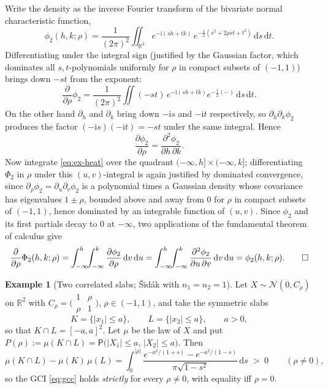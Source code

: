 \documentclass[12pt,a4paper]{article}
\makeatletter
\theoremstyle{definition}
\newtheorem{example}[theorem]{Example}
\renewenvironment{proof}[1][\proofname]{\par
  \pushQED{\qed}%
  \normalfont \topsep6\p@\@plus6\p@\relax
  \trivlist
  \item[\hskip\labelsep\bfseries #1\@addpunct{.}]\ignorespaces
}{%
  \popQED\endtrivlist\@endpefalse
}
\newcommand{\R}{\mathbb{R}}
\newcommand{\PP}{\mathsf{P}}
\newcommand{\dd}{\mathrm{d}}
\newcommand{\caln}{\mathcal{N}}
\makeatother
\begin{document}
\begin{proof}
  Write the density as the inverse Fourier transform of the bivariate
  normal characteristic function,
  \[
    \phi_2(h,k;\rho)
    =\frac{1}{(2\pi)^2}\iint_{\R^2}
      e^{-\mathrm i(sh+tk)}\,
      e^{-\frac12(s^2+2\rho st+t^2)}\,\dd s\,\dd t .
  \]
  Differentiating under the integral sign (justified by the Gaussian
  factor, which dominates all $s,t$-polynomials uniformly for $\rho$ in
  compact subsets of $(-1,1)$) brings down $-st$ from the exponent:
  \[
    \frac{\partial}{\partial\rho}\phi_2
    =\frac{1}{(2\pi)^2}\iint(-st)\,
      e^{-\mathrm i(sh+tk)}e^{-\frac12(\cdots)}\,\dd s\,\dd t .
  \]
  On the other hand $\partial_h$ and $\partial_k$ bring down $-\mathrm i s$
  and $-\mathrm i t$ respectively, so
  $\partial_h\partial_k\phi_2$ produces the factor
  $(-\mathrm i s)(-\mathrm i t)=-st$ under the same integral.  Hence
  \begin{equation}\label{eq:ex-heat}
    \frac{\partial\phi_2}{\partial\rho}
    =\frac{\partial^2\phi_2}{\partial h\,\partial k}.
  \end{equation}
  Now integrate \eqref{eq:ex-heat} over the quadrant
  $(-\infty,h]\times(-\infty,k]$; differentiating $\Phi_2$ in $\rho$
  under this $(u,v)$-integral is again justified by dominated
  convergence, since $\partial_\rho\phi_2=\partial_u\partial_v\phi_2$ is a
  polynomial times a Gaussian density whose covariance has eigenvalues
  $1\pm\rho$, bounded above and away from $0$ for $\rho$ in compact
  subsets of $(-1,1)$, hence dominated by an integrable function of
  $(u,v)$.  Since $\phi_2$ and its first partials
  decay to $0$ at $-\infty$, two applications of the fundamental theorem
  of calculus give
  \[
    \frac{\partial}{\partial\rho}\Phi_2(h,k;\rho)
    =\int_{-\infty}^{h}\!\!\int_{-\infty}^{k}
      \frac{\partial\phi_2}{\partial\rho}\,\dd v\,\dd u
    =\int_{-\infty}^{h}\!\!\int_{-\infty}^{k}
      \frac{\partial^2\phi_2}{\partial u\,\partial v}\,\dd v\,\dd u
    =\phi_2(h,k;\rho).\qedhere
  \]
\end{proof}

\begin{example}[Two correlated slabs; \v{S}id\'ak with $n_1=n_2=1$]\label{ex:box}
  Let $X\sim\caln(0,C_\rho)$ on $\R^2$ with
  $C_\rho=\bigl(\begin{smallmatrix}1&\rho\\\rho&1\end{smallmatrix}\bigr)$,
  $\rho\in(-1,1)$, and take the symmetric slabs
  \[
    K=\{|x_1|\leqslant a\},\qquad L=\{|x_2|\leqslant a\},\qquad a>0,
  \]
  so that $K\cap L=[-a,a]^2$.  Let $\mu$ be the law of $X$ and put
  $P(\rho):=\mu(K\cap L)=\PP\bigl(|X_1|\leqslant a,\,|X_2|\leqslant a\bigr)$.
  Then
  \begin{equation}\label{eq:ex-gap}
    \mu(K\cap L)-\mu(K)\,\mu(L)
    =\int_{0}^{|\rho|}
      \frac{e^{-a^2/(1+s)}-e^{-a^2/(1-s)}}{\pi\sqrt{1-s^2}}\,\dd s
    \;>\;0
    \qquad(\rho\neq 0),
  \end{equation}
  so the GCI \eqref{eq:gcc} holds \emph{strictly} for every $\rho\neq0$,
  with equality iff $\rho=0$.
\end{example}
\end{document}
